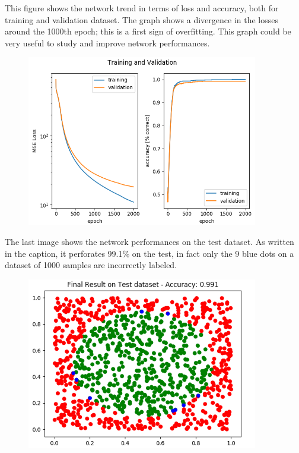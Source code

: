 \begin{minipage}{0.45\textwidth} 
	This figure shows the network trend in terms of loss and accuracy, both for training and validation dataset. The graph shows a divergence in the losses around the 1000th epoch; this is a first sign of overfitting. This graph could be very useful to study and improve network performances.
\end{minipage}
\begin{minipage}{0.5\textwidth} \raggedleft 
	\begin{figure}[H]
		\includegraphics[width=0.9\textwidth]{Images/LossAccFinal.png}
		\centering
	\end{figure}
\end{minipage}

\begin{minipage}{0.45\textwidth} 
	The last image shows the network performances on the test dataset. As written in the caption, it perforates 99.1\% on the test, in fact only the 9 blue dots on a dataset of 1000 samples are incorrectly labeled.
\end{minipage}
\begin{minipage}{0.5\textwidth} \raggedleft 
	\begin{figure}[H]
		\includegraphics[width=0.9\textwidth]{Images/FinalTestAccuracy.png}
		\centering
	\end{figure}
\end{minipage}

